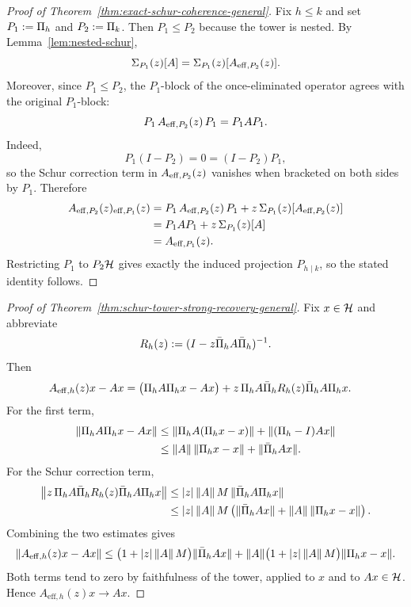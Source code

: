 \begin{proof}[Proof of Theorem~\ref{thm:exact-schur-coherence-general}]
\label{proof:thm:exact-schur-coherence-general}
Fix $h\le k$ and set $P_1:=\Pi_{h}$ and $P_2:=\Pi_{k}$. Then
$P_1\le P_2$ because the tower is nested. By
Lemma~\ref{lem:nested-schur},
\[
\Sigma_{P_1}(z)[A]
=
\Sigma_{P_1}(z)[A_{\mathrm{eff},P_2}(z)].
\]
Moreover, since $P_1\le P_2$, the $P_1$-block of the once-eliminated operator
agrees with the original $P_1$-block:
\[
P_1\,A_{\mathrm{eff},P_2}(z)\,P_1
=
P_1AP_1.
\]
Indeed,
\[
P_1(I-P_2)=0=(I-P_2)P_1,
\]
so the Schur correction term in $A_{\mathrm{eff},P_2}(z)$ vanishes when bracketed
on both sides by $P_1$. Therefore
\begin{align*}
A_{\mathrm{eff},P_2}(z)_{\mathrm{eff},P_1}(z)
&=
P_1\,A_{\mathrm{eff},P_2}(z)\,P_1
+
z\,\Sigma_{P_1}(z)[A_{\mathrm{eff},P_2}(z)] \\
&=
P_1AP_1 + z\,\Sigma_{P_1}(z)[A] \\
&=
A_{\mathrm{eff},P_1}(z).
\end{align*}
Restricting $P_1$ to $P_2\mathcal{H}$ gives exactly the induced projection
$P_{h\mid k}$, so the stated identity follows.
\end{proof}

\begin{proof}[Proof of Theorem~\ref{thm:schur-tower-strong-recovery-general}]
\label{proof:thm:schur-tower-strong-recovery-general}
Fix $x\in\mathcal{H}$ and abbreviate
\[
R_h(z):=(I-z\bar{\Pi}_{h}A\bar{\Pi}_{h})^{-1}.
\]
Then
\begin{align*}
A_{\mathrm{eff},h}(z)x-Ax
&=
\bigl(\Pi_{h}A\Pi_{h}x-Ax\bigr)
+
z\,\Pi_{h}A\bar{\Pi}_{h}R_h(z)\bar{\Pi}_{h}A\Pi_{h}x.
\end{align*}
For the first term,
\begin{align*}
\|\Pi_{h}A\Pi_{h}x-Ax\|
&\le
\|\Pi_{h}A(\Pi_{h}x-x)\|
+
\|(\Pi_{h}-I)Ax\| \\
&\le
\|A\|\,\|\Pi_{h}x-x\|
+
\|\bar{\Pi}_{h}Ax\|.
\end{align*}
For the Schur correction term,
\begin{align*}
\left\|
z\,\Pi_{h}A\bar{\Pi}_{h}R_h(z)\bar{\Pi}_{h}A\Pi_{h}x
\right\|
&\le
|z|\,\|A\|\,M\,\|\bar{\Pi}_{h}A\Pi_{h}x\| \\
&\le
|z|\,\|A\|\,M
\left(
\|\bar{\Pi}_{h}Ax\|
+
\|A\|\,\|\Pi_{h}x-x\|
\right).
\end{align*}
Combining the two estimates gives
\begin{align*}
\|A_{\mathrm{eff},h}(z)x-Ax\|
\le
\bigl(1+|z|\,\|A\|\,M\bigr)\|\bar{\Pi}_{h}Ax\|
+
\|A\|\bigl(1+|z|\,\|A\|\,M\bigr)\|\Pi_{h}x-x\|.
\end{align*}
Both terms tend to zero by faithfulness of the tower, applied to $x$ and to
$Ax\in\mathcal{H}$. Hence $A_{\mathrm{eff},h}(z)x\to Ax$.
\end{proof}

